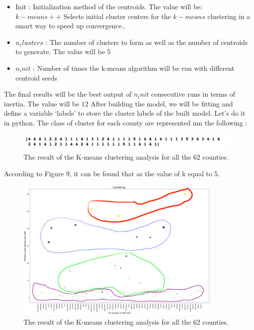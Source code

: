 \documentclass{article}
\begin{document}
\begin{itemize}
\item Init : Initialization method of the centroids. The value will be: $k-means++ $ Selects initial cluster centers for the $k-means$ clustering in a smart way to speed up convergence..
\item $n_clusters$ : The number of clusters to form as well as the number of centroids to generate. The value will be 5
\item $n_init$ : Number of times the k-means algorithm will be run with different centroid seeds
\end{itemize}

The final results will be the best output of $n_init$ consecutive runs in terms of inertia.  The value will be $12$ After building the model, we will be fitting and define a variable ‘labels’ to store the cluster labels of the built model. Let’s do it in python.   The  class of  cluster for each county are represented inn the following :
\begin{figure}[h!]
 \centering
\includegraphics[width=1.06\textwidth]{resulte.png}
 \caption{The  result of the K-means clustering analysis for all the 62 counties.}
\end{figure}

According to Figure 9, it can be found that as the value of k equal to 5.

\begin{figure}[h!]
 \centering
\includegraphics[width=0.9\textwidth]{kmeans2.png}
 \caption{The  result of the K-means clustering analysis for all the 62 counties.}
\end{figure}
\end{document}
